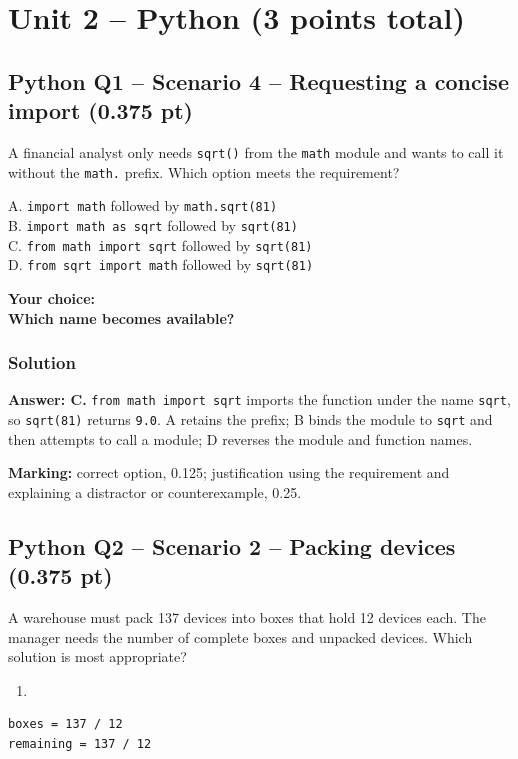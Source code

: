 \documentclass[10pt]{article}
\providecommand{\tightlist}{\setlength{\itemsep}{0pt}\setlength{\parskip}{0pt}}
\let\OldSection\section
\renewcommand{\section}{\clearpage\OldSection}
\begin{document}
\section*{Unit 2 -- Python (3 points total)}
\subsection*{Python Q1 -- Scenario 4 -- Requesting a concise import (0.375 pt)}
A financial analyst only needs \texttt{sqrt()} from the \texttt{math}
module and wants to call it without the \texttt{math.} prefix. Which
option meets the requirement?

A. \texttt{import\ math} followed by \texttt{math.sqrt(81)}\\
B. \texttt{import\ math\ as\ sqrt} followed by \texttt{sqrt(81)}\\
C. \texttt{from\ math\ import\ sqrt} followed by \texttt{sqrt(81)}\\
D. \texttt{from\ sqrt\ import\ math} followed by \texttt{sqrt(81)}

\textbf{Your choice:}\\
\textbf{Which name becomes available?}

\subsubsection*{Solution}
\textbf{Answer: C.} \texttt{from\ math\ import\ sqrt} imports the
function under the name \texttt{sqrt}, so \texttt{sqrt(81)} returns
\texttt{9.0}. A retains the prefix; B binds the module to \texttt{sqrt}
and then attempts to call a module; D reverses the module and function
names.

\textbf{Marking:} correct option, 0.125; justification using the
requirement and explaining a distractor or counterexample, 0.25.

\subsection*{Python Q2 -- Scenario 2 -- Packing devices (0.375 pt)}
A warehouse must pack 137 devices into boxes that hold 12 devices each.
The manager needs the number of complete boxes and unpacked devices.
Which solution is most appropriate?

\begin{enumerate}
\def\labelenumi{\Alph{enumi}.}
\tightlist
\item
\end{enumerate}

\begin{verbatim}
boxes = 137 / 12
remaining = 137 / 12
\end{verbatim}
\end{document}

